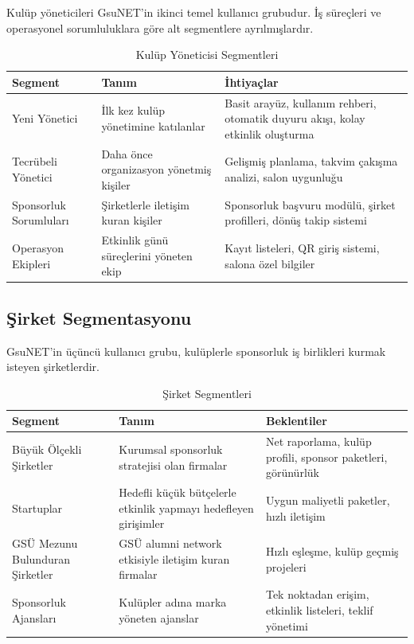 \documentclass[a4paper,12pt]{report}
\begin{document}
Kulüp yöneticileri GsuNET'in ikinci temel kullanıcı grubudur. İş süreçleri ve operasyonel sorumluluklara göre alt segmentlere ayrılmışlardır.

\begin{table}[h]
\centering
\small
\begin{tabular}{|p{3cm}|p{5cm}|p{6cm}|}
\hline
\textbf{Segment} & \textbf{Tanım} & \textbf{İhtiyaçlar} \\
\hline
Yeni Yönetici & İlk kez kulüp yönetimine katılanlar & Basit arayüz, kullanım rehberi, otomatik duyuru akışı, kolay etkinlik oluşturma \\
\hline
Tecrübeli Yönetici & Daha önce organizasyon yönetmiş kişiler & Gelişmiş planlama, takvim çakışma analizi, salon uygunluğu \\
\hline
Sponsorluk Sorumluları & Şirketlerle iletişim kuran kişiler & Sponsorluk başvuru modülü, şirket profilleri, dönüş takip sistemi \\
\hline
Operasyon Ekipleri & Etkinlik günü süreçlerini yöneten ekip & Kayıt listeleri, QR giriş sistemi, salona özel bilgiler \\
\hline
\end{tabular}
\caption{Kulüp Yöneticisi Segmentleri}
\end{table}

\bigskip
\bigskip
\bigskip
\bigskip
\bigskip
\bigskip
\bigskip
\bigskip
\bigskip
\bigskip


\subsection{Şirket Segmentasyonu}

GsuNET'in üçüncü kullanıcı grubu, kulüplerle sponsorluk iş birlikleri kurmak isteyen şirketlerdir.

\begin{table}[h]
\centering
\small
\begin{tabular}{|p{3.5cm}|p{5cm}|p{5.5cm}|}
\hline
\textbf{Segment} & \textbf{Tanım} & \textbf{Beklentiler} \\
\hline
Büyük Ölçekli Şirketler & Kurumsal sponsorluk stratejisi olan firmalar & Net raporlama, kulüp profili, sponsor paketleri, görünürlük \\
\hline
Startuplar & Hedefli küçük bütçelerle etkinlik yapmayı hedefleyen girişimler & Uygun maliyetli paketler, hızlı iletişim \\
\hline
GSÜ Mezunu Bulunduran Şirketler & GSÜ alumni network etkisiyle iletişim kuran firmalar & Hızlı eşleşme, kulüp geçmiş projeleri \\
\hline
Sponsorluk Ajansları & Kulüpler adına marka yöneten ajanslar & Tek noktadan erişim, etkinlik listeleri, teklif yönetimi \\
\hline
\end{tabular}
\caption{Şirket Segmentleri}
\end{table}
\end{document}
